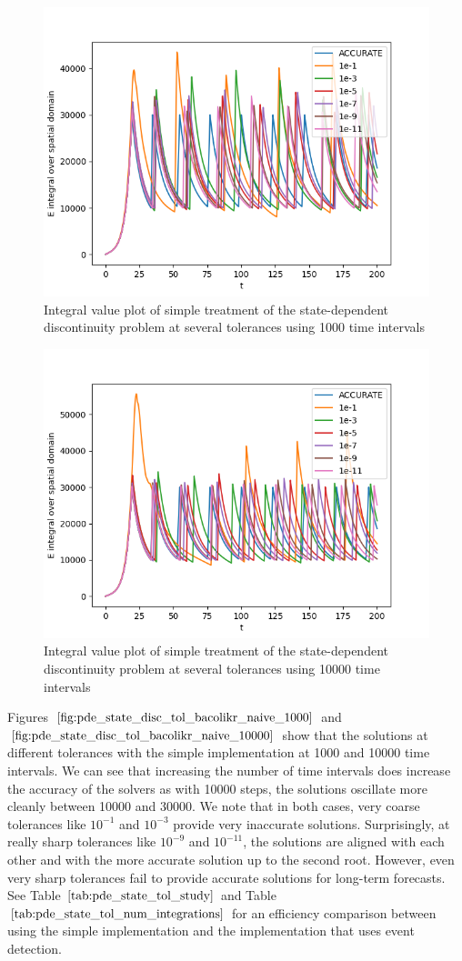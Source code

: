 \documentclass{article}
\begin{document}
\begin{figure}[H]
\centering
\includegraphics[width=0.7\linewidth]{./figures/pde_state_disc_tol_bacolikr_naive_1000}
\caption{Integral value plot of simple treatment of the state-dependent discontinuity problem at several tolerances using 1000 time intervals}
\label{fig:pde_state_disc_tol_bacolikr_naive_1000}
\end{figure}

\begin{figure}[H]
\centering
\includegraphics[width=0.7\linewidth]{./figures/pde_state_disc_tol_bacolikr_naive_10000}
\caption{Integral value plot of simple treatment of the state-dependent discontinuity problem at several tolerances using 10000 time intervals}
\label{fig:pde_state_disc_tol_bacolikr_naive_10000}
\end{figure}

Figures $\ref{fig:pde_state_disc_tol_bacolikr_naive_1000}$ and $\ref{fig:pde_state_disc_tol_bacolikr_naive_10000}$ show that the solutions at different tolerances with the simple implementation at 1000 and 10000 time intervals. We can see that increasing the number of time intervals does increase the accuracy of the solvers as with 10000 steps, the solutions oscillate more cleanly between 10000 and 30000. We note that in both cases, very coarse tolerances like $10^{-1}$ and $10^{-3}$ provide very inaccurate solutions. Surprisingly, at really sharp tolerances like $10^{-9}$ and $10^{-11}$, the solutions are aligned with each other and with the more accurate solution up to the second root. However, even very sharp tolerances fail to provide accurate solutions for long-term forecasts. See Table $\ref{tab:pde_state_tol_study}$ and Table $\ref{tab:pde_state_tol_num_integrations}$ for an efficiency comparison between using the simple implementation and the implementation that uses event detection. 
\end{document}
